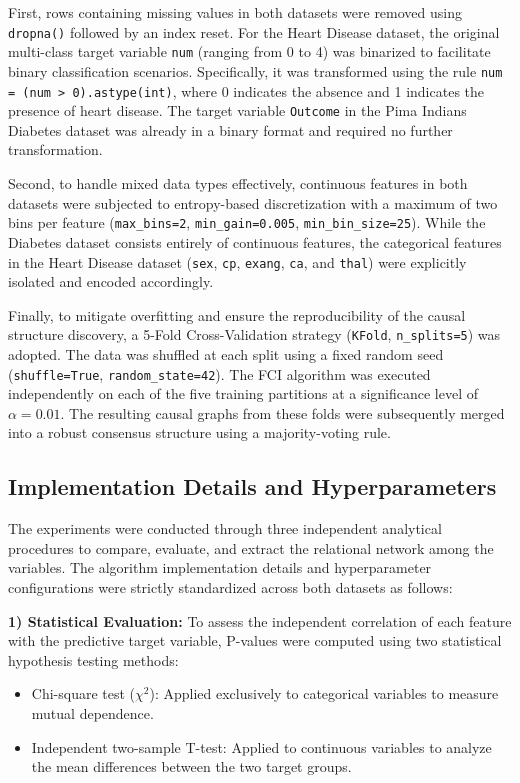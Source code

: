 \documentclass[conference, a4paper]{IEEEtran}
\begin{document}
First, rows containing missing values in both datasets were removed using \texttt{dropna()} followed by an index reset. For the Heart Disease dataset, the original multi-class target variable \texttt{num} (ranging from 0 to 4) was binarized to facilitate binary classification scenarios. Specifically, it was transformed using the rule \texttt{num = (num > 0).astype(int)}, where 0 indicates the absence and 1 indicates the presence of heart disease. The target variable \texttt{Outcome} in the Pima Indians Diabetes dataset was already in a binary format and required no further transformation.

Second, to handle mixed data types effectively, continuous features in both datasets were subjected to entropy-based discretization with a maximum of two bins per feature (\texttt{max\_bins=2}, \texttt{min\_gain=0.005}, \texttt{min\_bin\_size=25}). While the Diabetes dataset consists entirely of continuous features, the categorical features in the Heart Disease dataset (\texttt{sex}, \texttt{cp}, \texttt{exang}, \texttt{ca}, and \texttt{thal}) were explicitly isolated and encoded accordingly.

Finally, to mitigate overfitting and ensure the reproducibility of the causal structure discovery, a 5-Fold Cross-Validation strategy (\texttt{KFold}, \texttt{n\_splits=5}) was adopted. The data was shuffled at each split using a fixed random seed (\texttt{shuffle=True}, \texttt{random\_state=42}). The FCI algorithm was executed independently on each of the five training partitions at a significance level of $\alpha = 0.01$. The resulting causal graphs from these folds were subsequently merged into a robust consensus structure using a majority-voting rule.
\subsection{Implementation Details and Hyperparameters}

The experiments were conducted through three independent analytical procedures to compare, evaluate, and extract the relational network among the variables. The algorithm implementation details and hyperparameter configurations were strictly standardized across both datasets as follows:

\textbf{1) Statistical Evaluation:} 
To assess the independent correlation of each feature with the predictive target variable, P-values were computed using two statistical hypothesis testing methods:
\begin{itemize}
    \item Chi-square test ($\chi^2$): Applied exclusively to categorical variables to measure mutual dependence.
    \item Independent two-sample T-test: Applied to continuous variables to analyze the mean differences between the two target groups.
\end{itemize}
\end{document}
